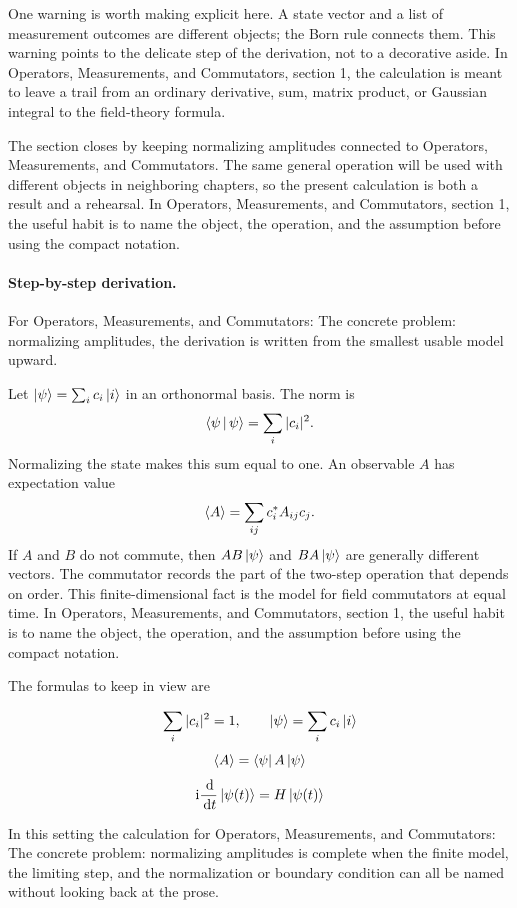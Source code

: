 One warning is worth making explicit here.  A state vector and a list of measurement outcomes are different objects; the Born rule connects them.  This warning points to the delicate step of the derivation, not to a decorative aside.  In Operators, Measurements, and Commutators, section 1, the calculation is meant to leave a trail from an ordinary derivative, sum, matrix product, or Gaussian integral to the field-theory formula.

The section closes by keeping normalizing amplitudes connected to Operators, Measurements, and Commutators.  The same general operation will be used with different objects in neighboring chapters, so the present calculation is both a result and a rehearsal.  In Operators, Measurements, and Commutators, section 1, the useful habit is to name the object, the operation, and the assumption before using the compact notation.



\paragraph{Step-by-step derivation.}

For Operators, Measurements, and Commutators: The concrete problem: normalizing amplitudes, the derivation is written from the smallest usable model upward.

Let \(\left|\psi\right\rangle=\sum_i c_i\left|i\right\rangle\) in an orthonormal basis.  The norm is
\[
  \left\langle \psi\,\middle|\,\psi\right\rangle=\sum_i |c_i|^2.
\]
Normalizing the state makes this sum equal to one.  An observable \(A\) has expectation value
\[
  \left\langle A\right\rangle=\sum_{ij}c_i^*A_{ij}c_j.
\]
If \(A\) and \(B\) do not commute, then \(AB\left|\psi\right\rangle\) and \(BA\left|\psi\right\rangle\) are generally different vectors.  The commutator records the part of the two-step operation that depends on order.  This finite-dimensional fact is the model for field commutators at equal time.  In Operators, Measurements, and Commutators, section 1, the useful habit is to name the object, the operation, and the assumption before using the compact notation.

The formulas to keep in view are

\[
  \sum_i |c_i|^2=1,\qquad \left|\psi\right\rangle=\sum_i c_i\left|i\right\rangle
\]
\[
  \left\langle A\right\rangle=\left\langle \psi\right|A\left|\psi\right\rangle
\]
\[
  \mathrm i\frac{\,\mathrm d}{\,\mathrm d t}\left|\psi(t)\right\rangle=H\left|\psi(t)\right\rangle
\]

In this setting the calculation for Operators, Measurements, and Commutators: The concrete problem: normalizing amplitudes is complete when the finite model, the limiting step, and the normalization or boundary condition can all be named without looking back at the prose.




